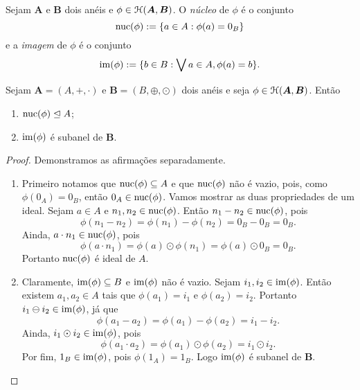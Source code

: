 \begin{definition}
	Sejam $\bm A$ e $\bm B$ dois anéis e $\phi \in \mathcal{H}(\bm A,\bm B)$. O \emph{núcleo} de $\phi$ é o conjunto
	\begin{equation*}
	\operatorname{nuc}(\phi) := \{a \in A : \phi(a) = 0_B\}
	\end{equation*}
e a \emph{imagem} de $\phi$ é o conjunto
	\begin{equation*}
	\operatorname{im}(\phi) := \{b \in B : \bigvee\nolimits a \in A, \phi(a) = b\}.
	\end{equation*}
\end{definition}

\begin{proposition}
	Sejam $\bm A=(A,+,\cdot)$ e $\bm B=(B,\oplus,\odot)$ dois anéis e seja $\phi \in \mathcal{H}(\bm A,\bm B)$. Então
	\begin{enumerate}
	\item $\operatorname{nuc}(\phi) \mathrel{\unlhd} A$;
	\item $\operatorname{im}(\phi)$ é subanel de $\textbf{B}$.
	\end{enumerate}
\end{proposition}
\begin{proof}Demonstramos as afirmações separadamente.
	\begin{enumerate}
	\item Primeiro notamos que $\operatorname{nuc}(\phi) \subseteq A$ e que $\operatorname{nuc}(\phi)$ não é vazio, pois, como $\phi(0_A)=0_B$, então $0_A \in \operatorname{nuc}(\phi)$. Vamos mostrar as duas propriedades de um ideal. Sejam $a \in A$ e $n_1,n_2 \in \operatorname{nuc}(\phi)$. Então $n_1-n_2 \in \operatorname{nuc}(\phi)$, pois
	\begin{equation*}
	\phi(n_1-n_2) = \phi(n_1)-\phi(n_2) = 0_B - 0_B = 0_B.
	\end{equation*}
Ainda, $a \cdot n_1 \in \operatorname{nuc}(\phi)$, pois
	\begin{equation*}
	\phi(a \cdot n_1) = \phi(a) \odot \phi(n_1) = \phi(a) \odot 0_B = 0_B.
	\end{equation*}
Portanto $\operatorname{nuc}(\phi)$ é ideal de $A$.
	\item Claramente, $\operatorname{im}(\phi) \subseteq B$ e $\operatorname{im}(\phi)$ não é vazio. Sejam $i_1,i_2 \in \operatorname{im}(\phi)$. Então existem $a_1,a_2 \in A$ tais que $\phi(a_1)=i_1$ e $\phi(a_2)=i_2$. Portanto $i_1 \ominus i_2 \in \operatorname{im}(\phi)$, já que
	\begin{equation*}
	\phi(a_1-a_2)= \phi(a_1)-\phi(a_2)=i_1-i_2.
	\end{equation*}
Ainda, $i_1 \odot i_2 \in \operatorname{im}(\phi)$, pois
	\begin{equation*}
	\phi(a_1 \cdot a_2)= \phi(a_1) \odot \phi(a_2) = i_1 \odot i_2.
	\end{equation*}
Por fim, $1_B \in \operatorname{im}(\phi)$, pois $\phi(1_A)=1_B$. Logo $\operatorname{im}(\phi)$ é subanel de $\bm B$.
	\end{enumerate}
\end{proof}

